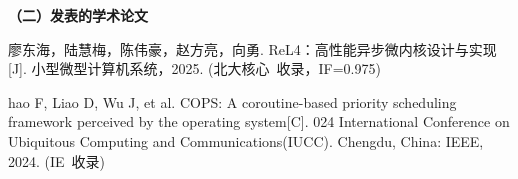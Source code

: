 
\begin{publications}{99}
 \noindent\textbf{（二）发表的学术论文}
 \begin{publist}
 \item  廖东海，陆慧梅，陈伟豪，赵方亮，向勇. ReL4：高性能异步微内核设计与实现[J]. 小型微型计算机系统，2025. (北大核心~收录，IF=0.975)
 \item  hao F, Liao D, Wu J, et al. COPS: A coroutine-based priority scheduling framework perceived by the operating system[C]. 024 International Conference on Ubiquitous Computing and Communications(IUCC). Chengdu, China: IEEE, 2024. (IE~收录)
 \end{publist}

    
\end{publications}
